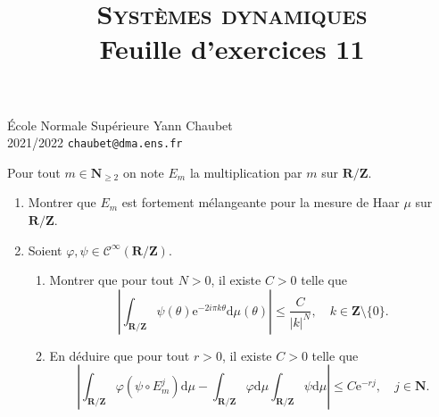 \documentclass[a4paper,10pt,openany]{article}
\title{\textsc{Syst\`emes dynamiques} \\ Feuille d'exercices 11}
\date{}
\author{}
\theoremstyle{plain}
\theoremstyle{definition}
\newcommand{\e}{\mathrm{e}}
\newcommand{\dd}{\mathrm{d}}
\newcommand{\R}{\mathbf{R}}
\newcommand{\Z}{\mathbf{Z}}
\newcommand{\N}{\mathbf{N}}
\begin{document}
{\noindent \'Ecole Normale Sup\'erieure  \hfill Yann Chaubet } \\
{2021/2022 \hfill \texttt{chaubet@dma.ens.fr}}

{\let\newpage\relax\maketitle}
\maketitle

\iffalse
\noindent {\large \textbf{Exercice 1.} \textit{M\'elange des d\'ecalages de Bernouilli}} \vspace{1.5mm} 

\noindent Soit $\Sigma_\ell = \{1, \dots, \ell\}$ o\`u $\ell \in \N_{\geq 1}$ et $\sigma$ le d\'ecalage sur $X = (\Sigma_\ell)^\Z$. On se donne $p_1, \dots, p_\ell \in [0,1]$ tels que $p_1 + \dots + p_\ell = 1$ et on consid\`ere l'unique probabilit\'e $\mu$ sur $(X, \mathcal{P}(\Sigma_\ell)^{\otimes \Z})$ telle que 
$$
\mu \Bigl(\bigl\{x = (x_n)_{n \in \Z} \in X,~x_j = k_j,~|j| \leq N \bigr\} \Bigr) = \prod_{j=-n}^n p_{k_j}, \quad N \in \N, \quad k_j \in \Sigma_\ell.
$$
Montrer que $\sigma$ est m\'elangeante sur $(X,\mu)$.


\vspace{0.6cm}
\fi


 \vspace{1.5mm} 

\noindent Pour tout $m \in \N_{\geq 2}$ on note $E_m$ la multiplication par $m$ sur $\R/\Z$. 

\begin{enumerate}
\item Montrer que $E_m$ est fortement m\'elangeante pour la mesure de Haar $\mu$ sur $\R/\Z$.
\item Soient $\varphi, \psi \in \mathcal{C}^{\infty}(\R/\Z)$. 
\begin{enumerate}
\item Montrer que pour tout $N > 0$, il existe $C > 0$ telle que
$$
\left| \int_{\R/\Z} \psi(\theta) \e^{-2i\pi k \theta} \dd \mu (\theta)\right| \leq \frac{C}{|k|^{N}}, \quad k \in \Z \setminus \{0\}.
$$
\item En d\'eduire que pour tout $r> 0$, il existe $C > 0$ telle que 
$$
\left|\int_{\R/\Z} \varphi \left(\psi \circ E_m^j\right) \dd \mu - \int_{\R/\Z} \varphi \dd \mu \int_{\R/\Z} \psi \dd \mu \right| \leq C \e^{-rj}, \quad j \in \N.
$$
\end{enumerate}
\end{enumerate}
\end{document}
